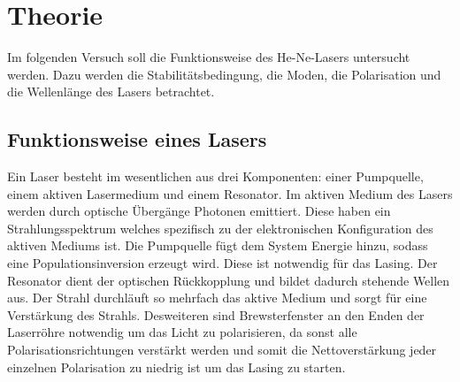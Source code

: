\section{Theorie}
\label{sec:Theorie}
Im folgenden Versuch soll die Funktionsweise des He-Ne-Lasers untersucht werden.
Dazu werden die Stabilitätsbedingung, die Moden, die Polarisation und die Wellenlänge des Lasers betrachtet.
\\
\subsection{Funktionsweise eines Lasers}
Ein Laser besteht im wesentlichen aus drei Komponenten: einer Pumpquelle, einem aktiven Lasermedium und einem Resonator.
Im aktiven Medium des Lasers werden durch optische Übergänge Photonen emittiert. Diese haben ein Strahlungsspektrum welches spezifisch zu der elektronischen
Konfiguration des aktiven Mediums ist. Die Pumpquelle fügt dem System Energie hinzu, sodass eine Populationsinversion erzeugt wird. Diese ist notwendig für das Lasing.
Der Resonator dient der optischen Rückkopplung und bildet dadurch stehende Wellen aus.
Der Strahl durchläuft so mehrfach das aktive Medium und sorgt für eine Verstärkung des Strahls.
Desweiteren sind Brewsterfenster an den Enden der Laserröhre notwendig um das Licht zu polarisieren, da sonst alle Polarisationsrichtungen verstärkt werden und somit die Nettoverstärkung
jeder einzelnen Polarisation zu niedrig ist um das Lasing zu starten.

